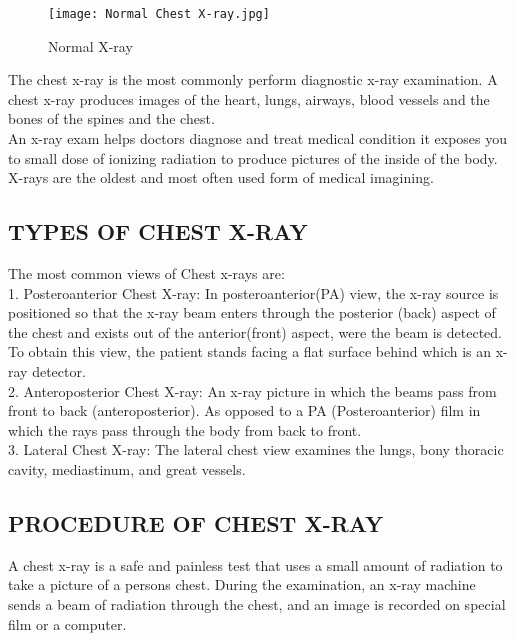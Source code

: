 \documentclass[12pt]{article}
\begin{document}
\begin{figure}[h]
\centering
\texttt{[image: Normal Chest X-ray.jpg]}
\caption{Normal X-ray}
\end{figure}



{\large The chest x-ray is the most commonly perform diagnostic x-ray examination. A chest x-ray produces images of the heart, lungs, airways, blood vessels and the bones of the spines and the chest.\\An x-ray exam helps doctors diagnose and treat medical condition it exposes you to small dose of ionizing radiation to produce pictures of the inside of the body. X-rays are the oldest and most often used form of medical imagining.}



\subsection{TYPES OF CHEST X-RAY}

{\large The most common views of Chest x-rays are:\\
\hspace{1cm}
1. Posteroanterior Chest X-ray: In posteroanterior(PA) view, the x-ray source is positioned so that the x-ray beam enters through the posterior (back) aspect of the chest and exists out of the anterior(front) aspect, were the beam is detected. To obtain this view, the patient stands facing a flat surface behind which is an x-ray detector.\\
\hspace{1cm}
2. Anteroposterior Chest X-ray: An x-ray picture in which the beams pass from front to back (anteroposterior). As opposed to a PA (Posteroanterior) film in which the rays pass through the body from back to front.\\
\hspace{1cm}
3. Lateral Chest X-ray: The lateral chest view examines the lungs, bony thoracic cavity, mediastinum, and great vessels.}


\subsection{PROCEDURE OF CHEST X-RAY}

{\large A chest x-ray is a safe and painless test that uses a small amount of radiation to take a picture of a persons chest. During the examination, an x-ray machine sends a beam of radiation through the chest, and an image is recorded on special film or a computer.}
\end{document}
